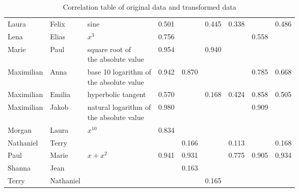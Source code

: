 \begin{table}[ht!]
\begin{tabular}{|l|l|l|r|r|r|r|r|r|}
     Laura &      Felix &                                    sine &  0.501 &            &     0.445 &    0.338 &       & 0.486 \\[0.25cm]
      Lena &      Elias &                                 $x ^ 3$ &  0.756 &            &           &          & 0.558 &  ~    \\[0.25cm]
     Marie &       Paul &   \makecell{square root of \\the absolute value} &  0.954 &            &     0.940 &          &       & ~     \\[0.25cm]
Maximilian &       Anna & \makecell{base 10 logarithm of \\the absolute value} &  0.942 &      0.870 &           &          & 0.785 & 0.668 \\[0.25cm]
Maximilian &     Emilia &                      hyperbolic tangent &  0.570 &            &     0.168 &    0.424 & 0.858 & 0.505 \\[0.25cm]
Maximilian &      Jakob & \makecell{natural logarithm of \\the absolute value} &  0.980 &            &           &          & 0.909 & ~     \\[0.25cm]
    Morgan &      Laura &                               $x ^{10}$ &  0.834 &            &           &          &       & ~     \\[0.25cm]
 Nathaniel &      Terry &                                         &        &      0.166 &           &    0.113 &       & 0.168 \\[0.25cm]
      Paul &      Marie &                             $x + x ^ 2$ &  0.941 &      0.931 &           &    0.775 & 0.905 & 0.934 \\[0.25cm]
    Shanna &       Jean &                                         &        &      0.163 &           &          &       & ~     \\[0.25cm]
     Terry &  Nathaniel &                                         &        &            &     0.165 &          &       & ~     \\[0.25cm]
\hline
\end{tabular}
\caption{Correlation table of original data and transformed data}
\label{tab:corr_transformation_table}
\end{table}
